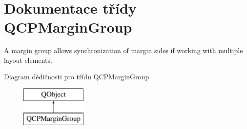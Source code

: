 \hypertarget{classQCPMarginGroup}{}\section{Dokumentace třídy Q\+C\+P\+Margin\+Group}
\label{classQCPMarginGroup}


A margin group allows synchronization of margin sides if working with multiple layout elements.  


Diagram dědičnosti pro třídu Q\+C\+P\+Margin\+Group\begin{figure}[H]
\begin{center}
\leavevmode
\includegraphics[height=2.000000cm]{classQCPMarginGroup}
\end{center}
\end{figure}

